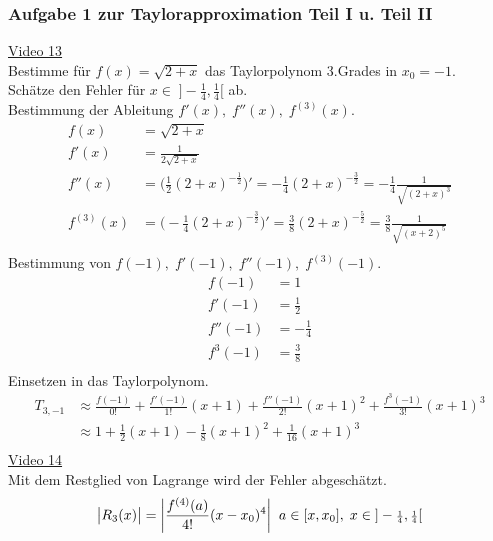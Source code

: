 \subsubsection{Aufgabe 1 zur Taylorapproximation Teil I u. Teil II}
\href{https://youtu.be/iHpIwbXhDLs}{Video 13}\\
Bestimme für $ f(x)=\sqrt{2+x} $ das Taylorpolynom 3.Grades in $ x_0=-1 $.\\
Schätze den Fehler für $ x\in\;]-\frac{1}{4},\frac{1}{4}[ $ ab.\\
\textbullet\;\; Bestimmung der Ableitung $ f'(x),\;f''(x),\;f^{(3)}(x) $.\\
\begin{align*}
f(x)&=\sqrt{2+x}\\
f'(x)&=\frac{1}{2\sqrt{2+x}}\\
f''(x)&=\bigg(\frac{1}{2}(2+x)^{-\frac{1}{2}}\bigg)'=-\frac{1}{4}(2+x)^{-\frac{3}{2}}=-\frac{1}{4}\frac{1}{\sqrt{(2+x)^3}}\\
f^{(3)}(x)&=\bigg(-\frac{1}{4}(2+x)^{-\frac{3}{2}}\bigg)'=\frac{3}{8}(2+x)^{-\frac{5}{2}}=\frac{3}{8}\frac{1}{\sqrt{(x+2)^{5}}}\\
\end{align*}
\textbullet\;\; Bestimmung von $ f(-1),\; f'(-1),\; f''(-1),\; f^{(3)}(-1) $.\\
\begin{align*}
f(-1)&=1\\
f'(-1)&=\frac{1}{2}\\
f''(-1)&=-\frac{1}{4}\\
f^{3}(-1)&=\frac{3}{8}\\
\end{align*}
\textbullet\;\; Einsetzen in das Taylorpolynom.\\
\begin{align*}
T_{3,-1}&\approx \frac{f(-1)}{0!}+\frac{f'(-1)}{1!}(x+1)+\frac{f''(-1)}{2!}(x+1)^2+\frac{f^{3}(-1)}{3!}(x+1)^3\\
&\approx 1+\frac{1}{2}(x+1)-\frac{1}{8}(x+1)^2+\frac{1}{16}(x+1)^3\\
\end{align*}
\href{https://youtu.be/KGQM0psy20I}{Video 14}\\
\textbullet\;\;Mit dem Restglied von Lagrange wird der Fehler abgeschätzt.\\
\begin{align*}
\big|R_3(x)\big|=\bigg|\frac{f^{(4)}(a)}{4!}(x-x_0)^{4}\bigg|\;\;a\in[x,x_0], \; x\in\;]-\genfrac{}{}{}{2}{1 }{4 },\genfrac{}{}{}{2}{1 }{4 }[\\
\end{align*}
